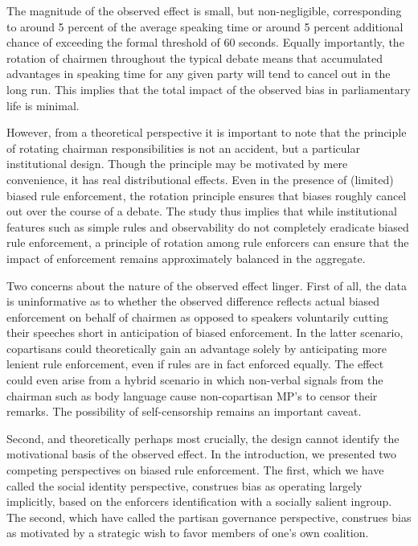 \documentclass[12pt,a4paper]{article}
\begin{document}
The magnitude of the observed effect is small, but non-negligible, corresponding to around 5 percent of the average speaking time or around 5 percent additional chance of exceeding the formal threshold of 60 seconds. Equally importantly, the rotation of chairmen throughout the typical debate means that accumulated advantages in speaking time for any given party will tend to cancel out in the long run. This implies that the total impact of the observed bias in parliamentary life is minimal.

However, from a theoretical perspective it is important to note that the principle of rotating chairman responsibilities is not an accident, but a particular institutional design. Though the principle may be motivated by mere convenience, it has real distributional effects. Even in the presence of (limited) biased rule enforcement, the rotation principle ensures that biases roughly cancel out over the course of a debate. The study thus implies that while institutional features such as simple rules and observability do not completely eradicate biased rule enforcement, a principle of rotation among rule enforcers can ensure that the impact of enforcement remains approximately balanced in the aggregate.

Two concerns about the nature of the observed effect linger. First of all, the data is uninformative as to whether the observed difference reflects actual biased enforcement on behalf of chairmen as opposed to speakers voluntarily cutting their speeches short in anticipation of biased enforcement. In the latter scenario, copartisans could theoretically gain an advantage solely by anticipating more lenient rule enforcement, even if rules are in fact enforced equally. The effect could even arise from a hybrid scenario in which non-verbal signals from the chairman such as body language cause non-copartisan MP's to censor their remarks. The possibility of self-censorship remains an important caveat.

Second, and theoretically perhaps most crucially, the design cannot identify the motivational basis of the observed effect. In the introduction, we presented two competing perspectives on biased rule enforcement. The first, which we have called the social identity perspective, construes bias as operating largely implicitly, based on the enforcers identification with a socially salient ingroup. The second, which have called the partisan governance perspective, construes bias as motivated by a strategic wish to favor members of one's own coalition.
\end{document}
